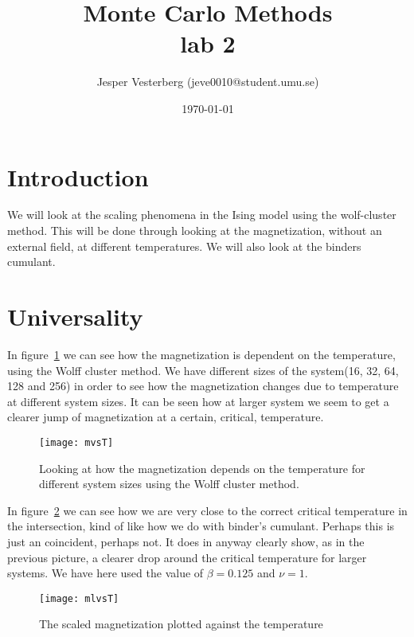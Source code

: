 \documentclass[11pt]{article}
\title{Monte Carlo Methods \\ lab 2}
\author{Jesper Vesterberg (jeve0010@student.umu.se)}
\date{\today}
\begin{document}
\begin{titlepage}
  \maketitle
  \thispagestyle{fancy}
  \rhead{\today}
  \begin{abstract}

  \end{abstract}
\end{titlepage}

\lhead{\theauthor}
\rhead{\thetitle\\\today}
\cfoot{\thepage}



\begin{thebibliography}{9}
\end{thebibliography}

\section{Introduction}
We will look at the scaling phenomena in the Ising model using the wolf-cluster method. This will be done through looking at the magnetization, without an external field, at different temperatures. We will also  look at the binders cumulant. 

\section{Universality}
In figure~\ref{fig:mvsT} we can see how the magnetization is dependent on the temperature, using
the Wolff cluster method. We have different sizes of the system(16, 32, 64, 128 and 256) in order to see how the magnetization changes due to temperature at different system sizes. It can be seen how at larger system we seem to get a clearer jump of magnetization at a certain, critical, temperature.
\begin{figure}[H]
	\centering
	\texttt{[image: mvsT]}
	\caption{Looking at how the magnetization depends on the temperature for different system sizes using the Wolff cluster
method.}
	\label{fig:mvsT}
\end{figure}

\newpage
In figure~\ref{fig:mlvsT} we can see how we are very close to the correct critical temperature in the
intersection, kind of like how we do with binder’s cumulant. Perhaps this is just an
coincident, perhaps not. It does in anyway clearly show, as in the previous picture, a
clearer drop around the critical temperature for larger systems. We have here used the value of $\beta = 0.125$ and $\nu = 1$.
\begin{figure}[H] 
	\centering
	\texttt{[image: mlvsT]}
	\caption{The scaled magnetization plotted against the temperature}
	\label{fig:mlvsT}
\end{figure}
\end{document}
